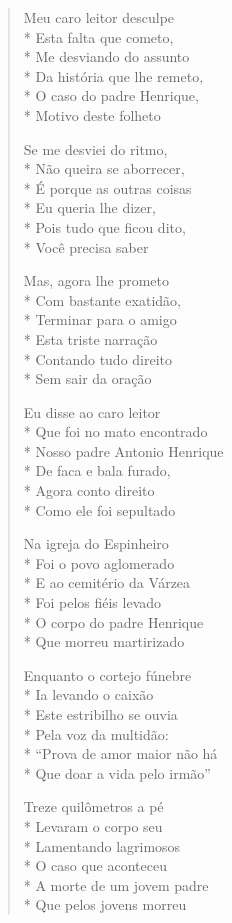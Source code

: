 \begin{verse}
Meu caro leitor desculpe\\*
Esta falta que cometo,\\*
Me desviando do assunto\\*
Da história que lhe remeto,\\*
O caso do padre Henrique,\\*
Motivo deste folheto

Se me desviei do ritmo,\\*
Não queira se aborrecer,\\*
É porque as outras coisas\\*
Eu queria lhe dizer,\\*
Pois tudo que ficou dito,\\*
Você precisa saber

\pagebreak

Mas, agora lhe prometo\\*
Com bastante exatidão,\\*
Terminar para o amigo\\*
Esta triste narração\\*
Contando tudo direito\\*
Sem sair da oração

Eu disse ao caro leitor\\*
Que foi no mato encontrado\\*
Nosso padre Antonio Henrique\\*
De faca e bala furado,\\*
Agora conto direito\\*
Como ele foi sepultado

Na igreja do Espinheiro\\*
Foi o povo aglomerado\\*
E ao cemitério da Várzea\\*
Foi pelos fiéis levado\\*
O corpo do padre Henrique\\*
Que morreu martirizado

Enquanto o cortejo fúnebre\\*
Ia levando o caixão\\*
Este estribilho se ouvia\\*
Pela voz da multidão:\\*
“Prova de amor maior não há\\*
Que doar a vida pelo irmão”

Treze quilômetros a pé\\*
Levaram o corpo seu\\*
Lamentando lagrimosos\\*
O caso que aconteceu\\*
A morte de um jovem padre\\*
Que pelos jovens morreu


\end{verse}
